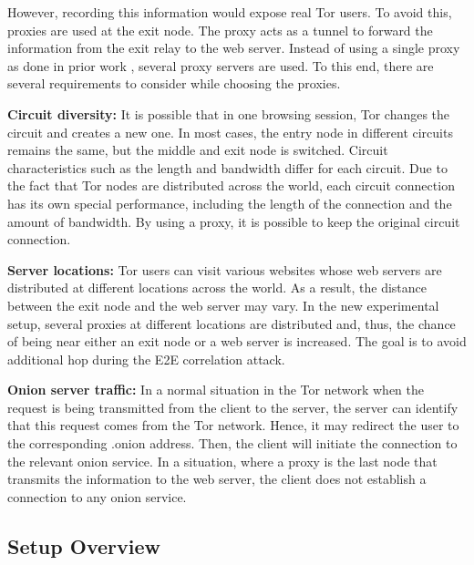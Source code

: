 \documentclass[sigconf]{acmart}
\begin{document}
 However, recording this information would expose real Tor users. To avoid this, proxies are used at the exit node. The proxy acts as a tunnel to forward the information from the exit relay to the web server. Instead of using a single proxy as done in prior work \cite{nasr2018deepcorr}, several proxy servers are used. To this end, there are several requirements to consider while choosing the proxies.

\vspace{3mm}

\textbf{Circuit diversity:} It is possible that in one browsing session, Tor changes the circuit and creates a new one. In most cases, the entry node in different circuits remains the same, but the middle and exit node is switched. Circuit characteristics such as the length and bandwidth differ for each circuit. Due to the fact that Tor nodes are distributed across the world, each circuit connection has its own special performance, including the length of the connection and the amount of bandwidth. By using a proxy, it is possible to keep the original circuit connection. 

\vspace{3mm}

\textbf{Server locations:} Tor users can visit various websites whose web servers are distributed at different locations across the world. As a result, the distance between the exit node and the web server may vary. In the new experimental setup, several proxies at different locations are distributed and, thus, the chance of being near either an exit node or a web server is increased. The goal is to avoid additional hop during the E2E correlation attack.  

\vspace{3mm}

\textbf{Onion server traffic:} In a normal situation in the Tor network when the request is being transmitted from the client to the server, the server can identify that this request comes from the Tor network. Hence, it may redirect the user to the corresponding .onion address. Then, the client will initiate the connection to the relevant onion service. In a situation, where a proxy is the last node that transmits the information to the web server, the client does not establish a connection to any onion service. 

\subsection{Setup Overview} \label{5.2}
\end{document}
